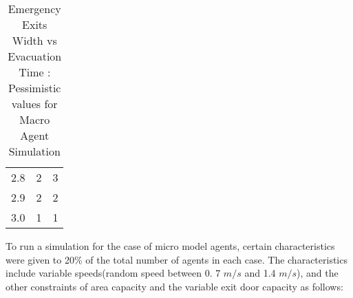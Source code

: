 \begin{table}[H]
{\begin{tabular}{|l|l|l|}
2.8                      & 2                                                                                                                   & 3                                                                                                                  \\
2.9                      & 2                                                                                                                   & 2                                                                                                                  \\
3.0                      & 1                                                                                                                   & 1                                                                                                                  \\
\hline
\end{tabular}}
\caption{Emergency Exits Width vs Evacuation Time : Pessimistic values for Macro Agent Simulation}
\label{Emergency Exits Width vs Evacuation Time : Pessimistic values for Macro Agent Simulation}
\end{table}

To run a simulation for the case of micro model agents, certain characteristics were given to 20\% of the total number of agents in each case. The characteristics include variable speeds(random speed between 0. 7 $m/s$ and 1.4 $m/s$), and the other constraints of area capacity and the variable exit door capacity as follows:


